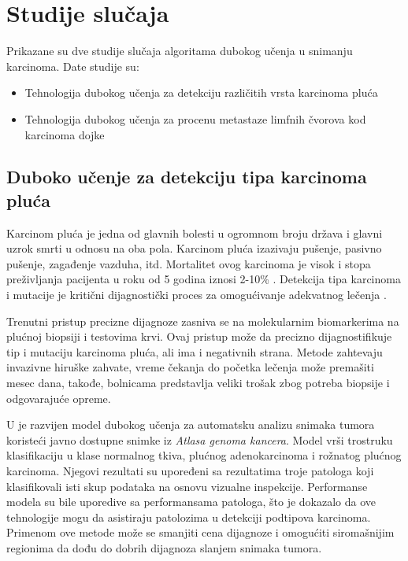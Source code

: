 \documentclass[a4paper]{article}
\begin{document}
\section{Studije slučaja}
\label{sec:naslov1} 

Prikazane su dve studije slučaja algoritama dubokog učenja u snimanju karcinoma. Date studije su:

\begin{itemize}
    \item Tehnologija dubokog učenja za detekciju različitih vrsta karcinoma pluća
    \item Tehnologija dubokog učenja za procenu metastaze limfnih čvorova kod karcinoma dojke
\end{itemize}

\subsection{Duboko učenje za detekciju tipa karcinoma pluća}
\label{subsec:podnaslov1}


Karcinom pluća je jedna od glavnih bolesti u ogromnom broju država i glavni uzrok smrti u odnosu na oba pola. Karcinom pluća izazivaju pušenje, pasivno pušenje, zagađenje vazduha, itd. Mortalitet ovog karcinoma je visok i stopa preživljanja pacijenta u roku od 5 godina iznosi 2-10\% \cite{bray}. Detekcija tipa karcinoma i mutacije je kritični dijagnostički proces za omogućivanje adekvatnog lečenja \cite{coccia}.

Trenutni pristup precizne dijagnoze zasniva se na molekularnim biomarkerima na plućnoj biopsiji i testovima krvi. Ovaj pristup može da precizno dijagnostifikuje tip i mutaciju karcinoma pluća, ali ima i negativnih strana. Metode zahtevaju invazivne hiruške zahvate, vreme čekanja do početka lečenja može premašiti mesec dana, takođe, bolnicama predstavlja veliki trošak zbog potreba biopsije i odgovarajuće opreme.

U \cite{coudray} je razvijen model dubokog učenja za automatsku analizu snimaka tumora koristeći javno dostupne snimke iz \emph{Atlasa genoma kancera}. Model vrši trostruku klasifikaciju u klase normalnog tkiva, plućnog adenokarcinoma i rožnatog plućnog karcinoma. Njegovi rezultati su upoređeni sa rezultatima troje patologa koji klasifikovali isti skup podataka na osnovu vizualne inspekcije. Performanse modela su bile uporedive sa performansama patologa, što je dokazalo da ove tehnologije mogu da asistiraju patolozima u detekciji podtipova karcinoma. Primenom ove metode može se smanjiti cena dijagnoze i omogućiti siromašnijim regionima da dođu do dobrih dijagnoza slanjem snimaka tumora.
\end{document}

